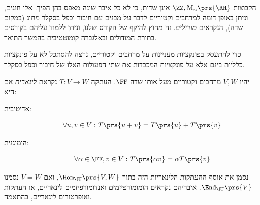 \documentclass[a4paper,10pt,twoside,openany]{book}
\renewcommand{\Mat}{\mathrm{M}}
\begin{document}
\begin{remark}
הקבוצות
$\ZZ, \Mat_n\prs{\RR}$
אינן שדות, כי לא כל איבר שונה מאפס בהן הפיך. אלו חוגים, וניתן באופן דומה למרחבים וקטוריים לדבר על מבנים עם חיבור וכפל בסקלר מחוג (במקום שדה), הנקראים
\emph{מודולים}.
זה מחוץ להיקף של הקורס שלנו, וניתן ללמוד עליהם בקורסים בתורת המודולים ובאלגברה קומוטטיבית בהמשך התואר.
\end{remark}

כדי להתעסק בפונקציות מעניינות על מרחבים וקטוריים, נרצה להסתכל לא על פונקציות כלליות בינם אלא על פונקציות המכבדות את שתי הפעולות האלו של חיבור וכפל בסקלר.

\begin{definition}
יהיו
$V,W$
מרחבים וקטוריים מעל אותו שדה
$\FF$.
העתקה
$T \colon V \to W$
נקראת
\emph{לינארית}
אם היא:
\begin{description}
\item[אדיטיבית:]
\begin{align*}
\forall u,v \in V: T\prs{u+v} = T\prs{u} + T\prs{v}
\end{align*}
\item[הומוגנית:]
\begin{align*}
\forall \alpha \in \FF, v \in V: T\prs{\alpha v} = \alpha T\prs{v}
\end{align*}
\end{description}
\end{definition}

\begin{notation}
נסמן את אוסף ההעתקות הלינאריות הזה בתור
$\Hom_\FF\prs{V,W}$,
ואם
$V=W$
נסמנו
$\End_\FF\prs{V}$.
איבריהם נקראים הומומורפיזמים ואנדומורפיזמים לינאריים, או העתקות ואופרטורים לינאריים, בהתאמה.
\end{notation}
\end{document}
